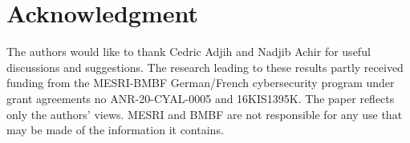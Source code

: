 \documentclass[journal]{IEEEtran}
\begin{document}
%





\section*{Acknowledgment}

The authors would like to thank Cedric Adjih and Nadjib Achir for useful discussions and suggestions. The research leading to these results partly received funding from the MESRI-BMBF German/French cybersecurity program under grant agreements no ANR-20-CYAL-0005 and 16KIS1395K. The paper reflects only the authors’ views. MESRI and BMBF are not responsible for any use that may be made of the information it contains.


\ifCLASSOPTIONcaptionsoff
  \newpage
\fi



\end{document}
